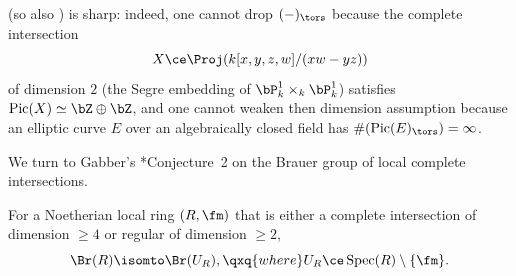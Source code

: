 \brem\label{eg:from-Hartshorne}
 (so also ) %
is sharp: indeed, one cannot drop $(-)_\tors$ because the complete intersection
\[
X\ce \Proj(k[ x, y, z, w]/(xw - yz))
\]
of dimension $2$ (the Segre embedding of $\bP^1_k \times_k \bP^1_k$) satisfies $\Pic(X) \simeq \bZ \oplus \bZ$, %
and one cannot weaken then dimension assumption because an elliptic curve $E$  over an algebraically closed field has $\#(\Pic(E)_\tors) = \infty$.
\erem






We turn to Gabber's \cite{Gab04}*{Conjecture~2} on the Brauer group of local complete intersections.



\bthm%
\label{deg-3-case}
For a Noetherian local ring $(R, \fm)$ that is either a complete intersection of dimension $\ge 4$ or regular of dimension $\ge 2$,
\[
\Br(R) \isomto \Br(U_R), \qxq{where} U_R \ce \Spec(R) \setminus \{ \fm\}.
\]
\ethm




